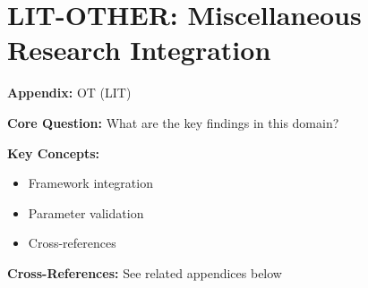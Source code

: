 

\chapter{LIT-OTHER: Miscellaneous Research Integration}
\label{app:lit-other}


\begin{tcolorbox}[colback=blue!5!white, colframe=blue!75!black,
    title=Quick Reference: Appendix OT]

\textbf{Appendix:} OT (LIT)

\textbf{Core Question:} What are the key findings in this domain?

\textbf{Key Concepts:}
\begin{itemize}[nosep]
\item Framework integration
\item Parameter validation
\item Cross-references
\end{itemize}

\textbf{Cross-References:} See related appendices below
\end{tcolorbox}

